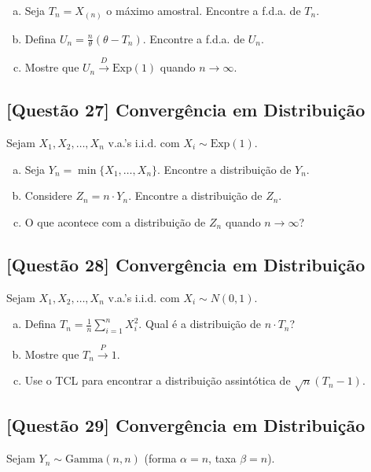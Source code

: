 \documentclass[12pt,a4paper]{article}
\begin{document}
\begin{enumerate}[(a)]
    \item Seja $T_n = X_{(n)}$ o máximo amostral. Encontre a f.d.a. de $T_n$.
    \item Defina $U_n = \frac{n}{\theta}(\theta - T_n)$. Encontre a f.d.a. de $U_n$.
    \item Mostre que $U_n \xrightarrow{D} \text{Exp}(1)$ quando $n \to \infty$.
\end{enumerate}

\subsection*{[Questão 27] Convergência em Distribuição}

Sejam $X_1, X_2, \ldots, X_n$ v.a.'s i.i.d. com $X_i \sim \text{Exp}(1)$.

\begin{enumerate}[(a)]
    \item Seja $Y_n = \min\{X_1, \ldots, X_n\}$. Encontre a distribuição de $Y_n$.
    \item Considere $Z_n = n \cdot Y_n$. Encontre a distribuição de $Z_n$.
    \item O que acontece com a distribuição de $Z_n$ quando $n \to \infty$?
\end{enumerate}

\subsection*{[Questão 28] Convergência em Distribuição}

Sejam $X_1, X_2, \ldots, X_n$ v.a.'s i.i.d. com $X_i \sim N(0, 1)$.

\begin{enumerate}[(a)]
    \item Defina $T_n = \frac{1}{n}\sum_{i=1}^n X_i^2$. Qual é a distribuição de $n \cdot T_n$?
    \item Mostre que $T_n \xrightarrow{P} 1$.
    \item Use o TCL para encontrar a distribuição assintótica de $\sqrt{n}(T_n - 1)$.
\end{enumerate}

\subsection*{[Questão 29] Convergência em Distribuição}

Sejam $Y_n \sim \text{Gamma}(n, n)$ (forma $\alpha = n$, taxa $\beta = n$).
\end{document}
